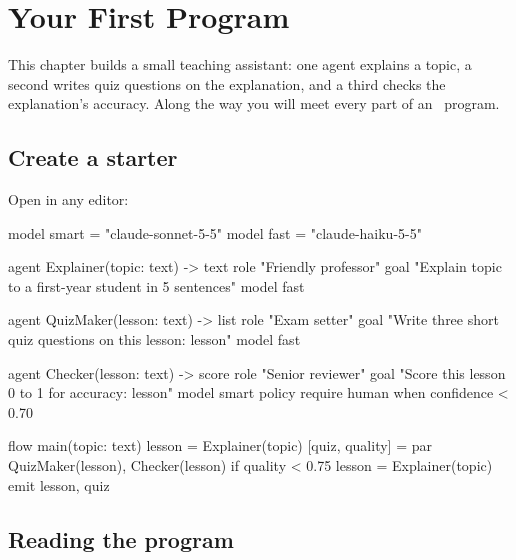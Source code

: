 \chapter{Your First Program}
\label{ch:first}

This chapter builds a small teaching assistant: one agent explains a topic, a second writes quiz questions on the explanation, and a third checks the explanation's accuracy. Along the way you will meet every part of an \algolang\ program.

\section{Create a starter}


Open  in any editor:

\begin{algo}[title=mylesson.algo]
model smart = "claude-sonnet-5-5"
model fast  = "claude-haiku-5-5"

agent Explainer(topic: text) -> text {
    role  "Friendly professor"
    goal  "Explain {topic} to a first-year student in 5 sentences"
    model fast
}

agent QuizMaker(lesson: text) -> list {
    role  "Exam setter"
    goal  "Write three short quiz questions on this lesson: {lesson}"
    model fast
}

agent Checker(lesson: text) -> score {
    role  "Senior reviewer"
    goal  "Score this lesson 0 to 1 for accuracy: {lesson}"
    model smart
    policy {
        require human when confidence < 0.70
    }
}

flow main(topic: text) {
    lesson = Explainer(topic)
    [quiz, quality] = par { QuizMaker(lesson), Checker(lesson) }
    if quality < 0.75 {
        lesson = Explainer(topic)
    }
    emit lesson, quiz
}
\end{algo}

\section{Reading the program}

